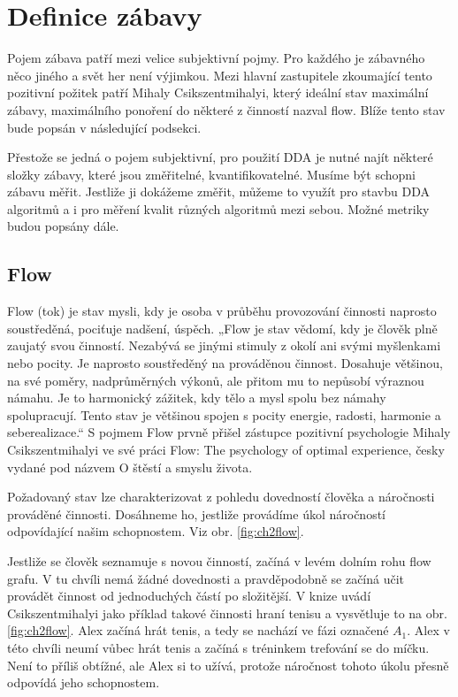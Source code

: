 \chapter{Definice zábavy}

Pojem zábava patří mezi velice subjektivní pojmy. Pro každého je zábavného něco jiného a svět her není výjimkou. Mezi hlavní zastupitele zkoumající tento pozitivní požitek patří Mihaly Csikszentmihalyi, který ideální stav maximální zábavy, maximálního ponoření do některé z činností nazval flow. Blíže tento stav bude popsán v následující podsekci.

Přestože se jedná o pojem subjektivní, pro použití DDA je nutné najít některé složky zábavy, které jsou změřitelné, kvantifikovatelné. Musíme být schopni zábavu měřit. Jestliže ji dokážeme změřit, můžeme to využít pro stavbu DDA algoritmů a i pro měření kvalit různých algoritmů mezi sebou. Možné metriky budou popsány dále.

\section{Flow}

Flow (tok) je stav mysli, kdy je osoba v průběhu provozování činnosti naprosto soustředěná, pociťuje nadšení, úspěch. „Flow je stav vědomí, kdy je člověk plně zaujatý svou činností. Nezabývá se jinými stimuly z okolí ani svými myšlenkami nebo pocity. Je naprosto soustředěný na prováděnou činnost. Dosahuje většinou, na své poměry, nadprůměrných výkonů, ale přitom mu to nepůsobí výraznou námahu. Je to harmonický zážitek, kdy tělo a mysl spolu bez námahy spolupracují. Tento stav je většinou spojen s pocity energie, radosti, harmonie a seberealizace.“ \cite{FlowCZ} S pojmem Flow prvně přišel zástupce pozitivní psychologie Mihaly Csikszentmihalyi ve své práci Flow: The psychology of optimal experience, česky vydané pod názvem O štěstí a smyslu života.

Požadovaný stav lze charakterizovat z pohledu dovedností člověka a náročnosti prováděné činnosti. Dosáhneme ho, jestliže provádíme úkol náročností odpovídající našim schopnostem. Viz obr. \ref{fig:ch2flow}. 

Jestliže se člověk seznamuje s novou činností, začíná v levém dolním rohu flow grafu. V tu chvíli nemá žádné dovednosti a pravděpodobně se začíná učit provádět činnost od jednoduchých částí po složitější. V knize \cite{OptimalFun} uvádí Csikszentmihalyi jako příklad takové činnosti hraní tenisu a vysvětluje to na obr. \ref{fig:ch2flow}. Alex začíná hrát tenis, a tedy se nachází ve fázi označené $A_1$. Alex v této chvíli neumí vůbec hrát tenis a začíná s tréninkem trefování se do míčku. Není to příliš obtížné, ale Alex si to užívá, protože náročnost tohoto úkolu přesně odpovídá jeho schopnostem.

